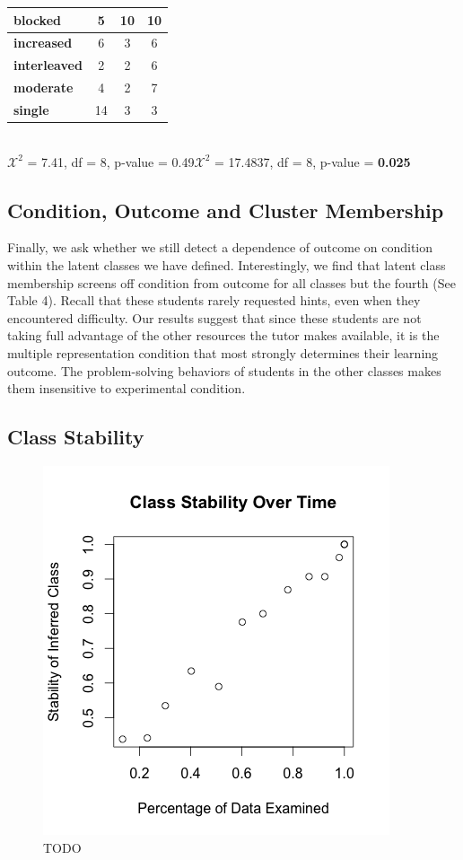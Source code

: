 \documentclass{edm_template}
\begin{document}
\begin{table}[htbp]
\begin{center}
\begin{tabular}{|l || c | c | c |}
  \textbf{blocked}&      5&  10& 10 \\ \hline
  \textbf{increased}&    6&  3&  6 \\ \hline
  \textbf{interleaved}&  2&  2&  6 \\ \hline
  \textbf{moderate}&     4&  2& 7 \\ \hline
  \textbf{single}&       14&  3&  3 \\ \hline
 \end{tabular}
\\$\mathcal{X}^2$ = 7.41, df = 8, p-value = 0.49\hspace{15pt}$\mathcal{X}^2$ = 17.4837, df = 8, p-value = {\bf 0.025}
\end{center}
\end{table}
\subsection{Condition, Outcome and Cluster Membership}
Finally, we ask whether we still detect a dependence of outcome on condition within the latent classes we have defined. Interestingly, we find that latent class membership screens off condition from outcome for all classes but the fourth (See Table 4). Recall that these students rarely requested hints, even when they encountered difficulty. Our results suggest that since these students are not taking full advantage of the other resources the tutor makes available, it is the multiple representation condition that most strongly determines their learning outcome. The problem-solving behaviors of students in the other classes makes them insensitive to experimental condition. 

\subsection{Class Stability}

\begin{figure}
\includegraphics[scale=.6]{class-stability.png}
\caption{TODO}
\label{fig:class-stability}
\end{figure}
\end{document}
